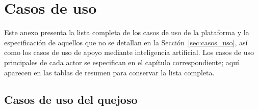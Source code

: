 \chapter{Casos de uso}
\label{anx:casos_uso}

Este anexo presenta la lista completa de los casos de uso de la plataforma y la especificación de aquellos que no se detallan en la Sección~\ref{sec:casos_uso}, así como los casos de uso de apoyo mediante inteligencia artificial. Los casos de uso principales de cada actor se especifican en el capítulo correspondiente; aquí aparecen en las tablas de resumen para conservar la lista completa.

\section{Casos de uso del quejoso}

